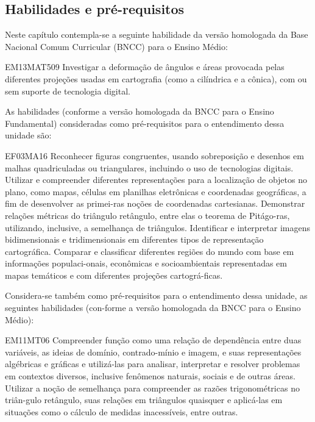 \begin{apresentacao}
{
\section*{Habilidades e pré-requisitos}

Neste capítulo contempla-se a seguinte habilidade da versão homologada da Base Nacional Comum Curricular (BNCC) para o Ensino Médio:

\begin{objetivos}{EM13MAT509}
Investigar a deformação de ângulos e áreas provocada pelas diferentes projeções usadas em cartografia (como a cilíndrica e a cônica), com ou sem suporte de tecnologia digital.
\end{objetivos}

 
As habilidades (conforme a versão homologada da BNCC para o Ensino Fundamental) consideradas como pré-requisitos para o entendimento dessa unidade são:

\begin{objetivos}{EF03MA16}
Reconhecer figuras congruentes, usando sobreposição e desenhos em malhas quadriculadas ou triangulares, incluindo o uso de tecnologias digitais.
 Utilizar e compreender diferentes representações para a localização de objetos no plano, como mapas, células em planilhas eletrônicas e coordenadas geográficas, a fim de desenvolver as primei-ras noções de coordenadas cartesianas.
 Demonstrar relações métricas do triângulo retângulo, entre elas o teorema de Pitágo-ras, utilizando, inclusive, a semelhança de triângulos.
Identificar e interpretar imagens bidimensionais e tridimensionais em diferentes tipos de representação cartográfica.
Comparar e classificar diferentes regiões do mundo com base em informações populaci-onais, econômicas e socioambientais representadas em mapas temáticos e com diferentes projeções cartográ-ficas.
\end{objetivos}


Considera-se também como pré-requisitos para o entendimento dessa unidade, as seguintes habilidades (con-forme a versão homologada da BNCC para o Ensino Médio):
\begin{objetivos}{EM11MT06}
Compreender função como uma relação de dependência entre duas variáveis, as ideias de domínio, contrado-mínio e imagem, e suas representações algébricas e gráficas e utilizá-las para analisar, interpretar e resolver problemas em contextos diversos, inclusive fenômenos naturais, sociais e de outras áreas.
 Utilizar a noção de semelhança para compreender as razões trigonométricas no triân-gulo retângulo, suas relações em triângulos quaisquer e aplicá-las em situações como o cálculo de medidas inacessíveis, entre outras.
\end{objetivos}

}
\end{apresentacao}
